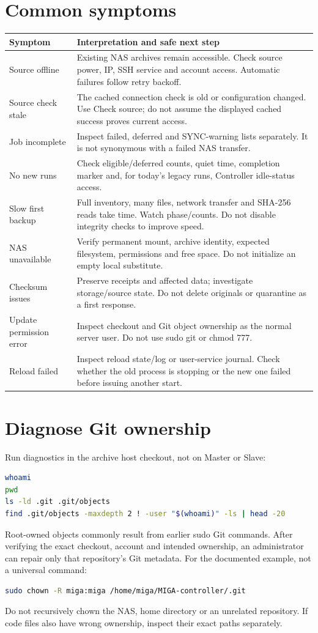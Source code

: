 \documentclass[11pt,oneside,openany]{book}
\begin{document}
\section{Common symptoms}
\begin{longtable}{p{41mm}p{112mm}}\toprule
Symptom&Interpretation and safe next step\\\midrule\endhead
Source offline&Existing NAS archives remain accessible. Check source power, IP,
SSH service and account access. Automatic failures follow retry backoff.\\
Source check stale&The cached connection check is old or configuration changed.
Use Check source; do not assume the displayed cached success proves current access.\\
Job incomplete&Inspect failed, deferred and SYNC-warning lists separately. It is
not synonymous with a failed NAS transfer.\\
No new runs&Check eligible/deferred counts, quiet time, completion marker and, for
today's legacy runs, Controller idle-status access.\\
Slow first backup&Full inventory, many files, network transfer and SHA-256 reads
take time. Watch phase/counts. Do not disable integrity checks to improve speed.\\
NAS unavailable&Verify permanent mount, archive identity, expected filesystem,
permissions and free space. Do not initialize an empty local substitute.\\
Checksum issues&Preserve receipts and affected data; investigate storage/source
state. Do not delete originals or quarantine as a first response.\\
Update permission error&Inspect checkout and Git object ownership as the normal
server user. Do not use sudo git or chmod 777.\\
Reload failed&Inspect reload state/log or user-service journal. Check whether the old
process is stopping or the new one failed before issuing another start.\\
\bottomrule\end{longtable}

\section{Diagnose Git ownership}
Run diagnostics in the archive host checkout, not on Master or Slave:
\begin{lstlisting}[language=bash]
whoami
pwd
ls -ld .git .git/objects
find .git/objects -maxdepth 2 ! -user "$(whoami)" -ls | head -20
\end{lstlisting}
Root-owned objects commonly result from earlier sudo Git commands. After verifying
the exact checkout, account and intended ownership, an administrator can repair
only that repository's Git metadata. For the documented example, not a universal command:
\begin{lstlisting}[language=bash]
sudo chown -R miga:miga /home/miga/MIGA-controller/.git
\end{lstlisting}
Do not recursively chown the NAS, home directory or an unrelated repository.
If code files also have wrong ownership, inspect their exact paths separately.
\end{document}

